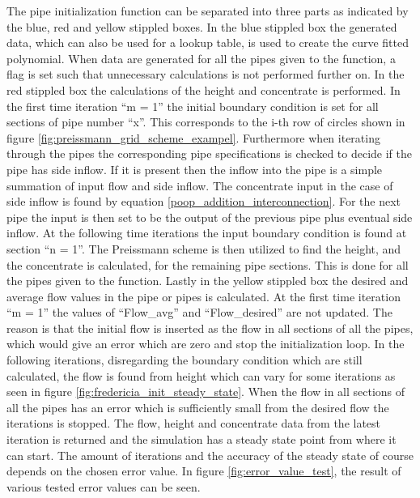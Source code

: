 The pipe initialization function can be separated into three parts as indicated by the blue, red and yellow stippled boxes. In the blue stippled box the generated data, which can also be used for a lookup table, is used to create the curve fitted polynomial. 
When data are generated for all the pipes given to the function, a flag is set such that unnecessary calculations is not performed further on. In the red stippled box the calculations of the height and concentrate is performed. In the first time iteration ``m = 1'' the initial boundary condition is set for all sections of pipe number ``x''. This corresponds to the i-th row of circles shown in figure \ref{fig:preissmann_grid_scheme_exampel}. Furthermore when iterating through the pipes the corresponding pipe specifications is checked to decide if the pipe has side inflow. If it is present then the inflow into the pipe is a simple summation of input flow and side inflow. The concentrate input in the case of side inflow is found by equation \ref{poop_addition_interconnection}.
For the next pipe the input is then set to be the output of the previous pipe plus eventual side inflow.%
At the following time iterations the input boundary condition is found at section ``n = 1''. The Preissmann scheme is then utilized to find the height, and the concentrate is calculated, for the remaining pipe sections. This is done for all the pipes given to the function.
Lastly in the yellow stippled box the desired and average flow values in the pipe or pipes is calculated. At the first time iteration ``m = 1'' the values of ``Flow\_avg'' and ``Flow\_desired'' are not updated. The reason is that the initial flow is inserted as the flow in all sections of all the pipes, which would give an error which are zero and stop the initialization loop. In the following iterations, disregarding the boundary condition which are still calculated, the flow is found from height which can vary for some iterations as seen in figure \ref{fig:fredericia_init_steady_state}. When the flow in all sections of all the pipes has an error which is sufficiently small from the desired flow the iterations is stopped. The flow, height and concentrate data from the latest iteration is returned and the simulation has a steady state point from where it can start. The amount of iterations and the accuracy of the steady state of course depends on the chosen error value. In figure \ref{fig:error_value_test}, the result of various tested error values can be seen.

